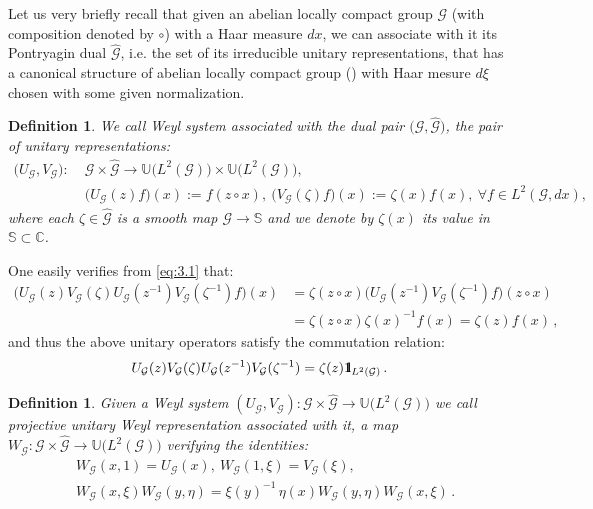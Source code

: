 \documentclass[12pt]{article}
\newtheorem{definition}[theorem]{Definition}
\theoremstyle{definition}
\def\Co{{\mathbb C}}
\def\bb1{{\rm{1}\hspace{-3pt}\mathbf{l}}}
\def\beq{\begin{equation}}
\def\eeq{\end{equation}}
\def\G{\mathcal{G}}
\numberwithin{equation}{section}
\begin{document}
Let us very briefly recall that given an abelian locally compact group $\mathcal{G}$ (with composition denoted by $\circ$) with a Haar measure $dx$, we can associate with it its Pontryagin dual $\widehat{\mathcal{G}}$, i.e. the set of its irreducible unitary representations, that has a canonical structure of abelian locally compact group (\cite{Fo-AHA}) with Haar mesure $d\xi$ chosen with some given normalization.  
\begin{definition} We call \textit{Weyl system associated with the dual pair} $\big(\mathcal{G},\hat{\mathcal{G}}\big)$, the pair of unitary representations:
\begin{align}\label{eq:3.1}
	\big(U_{\mathcal{G}},V_{\mathcal{G}}\big):\;&\mathcal{G}\times\widehat{\mathcal{G}}\rightarrow\mathbb{U}\big(L^2(\mathcal{G})\big)\times\mathbb{U}\big(L^2(\mathcal{G})\big),\\ \nonumber
	&\big(U_{\mathcal{G}}(z)f\big)(x):=f(z\circ{x}),\ \big(V_{\mathcal{G}}(\zeta)f\big)(x):=\zeta(x)f(x),\  \forall f\in L^2(\mathcal{G},dx),
\end{align}
where each $\zeta\in\widehat{\G}$ is a smooth map $\G\rightarrow\mathbb{S}$ and we denote by $\zeta(x)$ its value in $\mathbb{S}\subset\Co$.
\end{definition}
One easily verifies from \eqref{eq:3.1}  that:
 \beq\begin{split}
\big(U_{\mathcal{G}}(z)V_{\mathcal{G}}(\zeta)U_{\mathcal{G}}(z^{-1})V_{\mathcal{G}}(\zeta^{-1})f\big)(x)&=\zeta(z\circ{x})\big(U_{\mathcal{G}}(z^{-1})V_{\mathcal{G}}(\zeta^{-1})f\big)(z\circ{x})\\
&=\zeta(z\circ{x})\zeta(x)^{-1}f(x)=\zeta(z)f(x)\,,
 \end{split}\eeq 
and thus the above unitary operators satisfy the commutation relation:
\beq
U_{\mathcal{G}}(z)V_{\mathcal{G}}(\zeta)U_{\mathcal{G}}(z^{-1})V_{\mathcal{G}}(\zeta^{-1})=\zeta(z)\bb1_{L^2(\mathcal{G})}\,.
\eeq

 \begin{definition} Given a Weyl system $(U_{\G},V_{\G}):\G\times\widehat{\G}\rightarrow\mathbb{U}\big(L^2(\G)\big)$ we call \emph{projective unitary Weyl representation} associated with it, a map $W_{\G}:\G\times\widehat{\G}\rightarrow\mathbb{U}\big(L^2(\G)\big)$
verifying the identities:
\beq\label{F-W-prepr}\begin{split}
&W_{\G}(x,1)=U_{\G}(x),\ W_{\G}(1,\xi)=V_{\G}(\xi),\\ &W_{\G}(x,\xi)W_{\G}(y,\eta)=\xi(y)^{-1}\,\eta(x)W_{\G}(y,\eta)W_{\G}(x,\xi)\,.
\end{split}\eeq
\end{definition}
\end{document}
